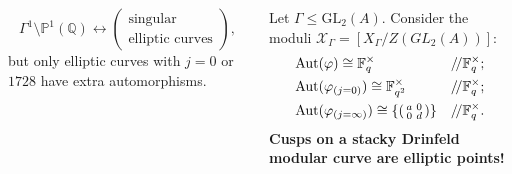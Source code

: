 \documentclass[handout]{beamer}
\numberwithin{equation}{section}
\numberwithin{case}{theorem}
\newcommand{\sX}{\mathscr{X}}		%
\newcommand{\bbF}{\mathbb{F}}		%
\newcommand{\bbP}{\mathbb{P}}		%
\newcommand{\bbQ}{\mathbb{Q}}		%
\newcommand{\GL}{\mathrm{GL}} 	%
\newcommand{\Aut}{\mathrm{Aut}} 	%
\newcommand{\<}{\left\langle}
\renewcommand{\>}{\right\rangle}
\begin{document}
\begin{frame}
\begin{columns}
\begin{column}{.5\textwidth}
				\pause
				\[\Gamma^1\setminus\bbP^1(\bbQ)\leftrightarrow\left(\begin{array}{c}\text{singular}\\\text{elliptic curves}\end{array}\right),\]
				but only elliptic curves with $j=0$ or $1728$ have extra automorphisms.
			\end{column}\pause
			\begin{column}{.5\textwidth}
				Let $\Gamma\leq \GL_2(A).$ Consider the moduli $\sX_{\Gamma}=[X_{\Gamma}/Z(GL_2(A))]:$ \pause
				\begin{align*}
					&\Aut(\varphi)\cong \bbF_q^{\times}& /\!/\bbF_q^{\times};\\ 
					&\Aut(\varphi_{(j=0)})\cong \bbF_{q^2}^{\times}& /\!/\bbF_q^{\times};\\ 
					&\Aut(\varphi_{(j=\infty)})\cong\{\begin{psmallmatrix}a&0\\0&d\end{psmallmatrix}\}&/\!/\bbF_q^{\times}.
				\end{align*}
				\textbf{Cusps on a stacky Drinfeld modular curve are elliptic points!}
				
			\end{column}
		\end{columns}
	\end{frame}
	
\end{document}
